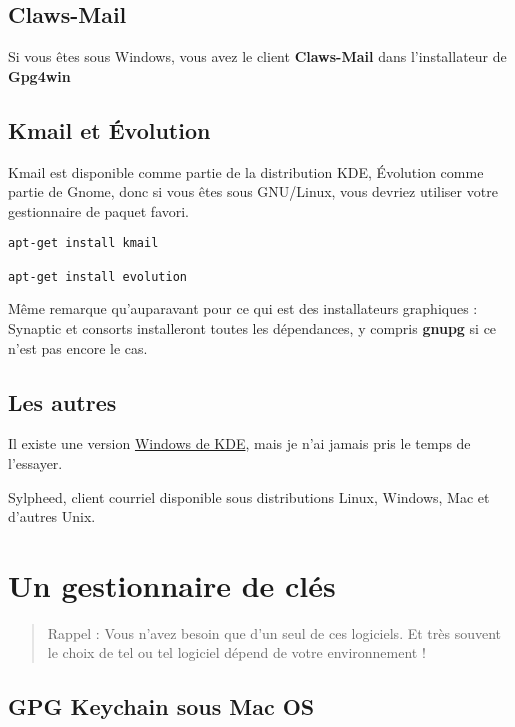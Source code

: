\subsection{Claws-Mail}\label{claws-mail}

Si vous êtes sous Windows, vous avez le client \textbf{Claws-Mail} dans
l'installateur de \textbf{Gpg4win}

\subsection{Kmail et Évolution}\label{kmail-et-uxe9volution}

Kmail est disponible comme partie de la distribution KDE, Évolution
comme partie de Gnome, donc si vous êtes sous GNU/Linux, vous devriez
utiliser votre gestionnaire de paquet favori.

\begin{lstlisting}
apt-get install kmail

apt-get install evolution
\end{lstlisting}

Même remarque qu'auparavant pour ce qui est des installateurs graphiques
: Synaptic et consorts installeront toutes les dépendances, y compris
\textbf{gnupg} si ce n'est pas encore le cas.

\subsection{Les autres}\label{les-autres}

Il existe une version \href{https://windows.kde.org/}{Windows de KDE},
mais je n'ai jamais pris le temps de l'essayer.

Sylpheed, client courriel disponible sous distributions Linux, Windows,
Mac et d'autres Unix.

\section{Un gestionnaire de clés}\label{un-gestionnaire-de-cluxe9s}

\begin{quote}
Rappel : Vous n'avez besoin que d'un seul de ces logiciels. Et très
souvent le choix de tel ou tel logiciel dépend de votre environnement !
\end{quote}

\subsection{GPG Keychain sous Mac OS}\label{gpg-keychain-sous-mac-os}


